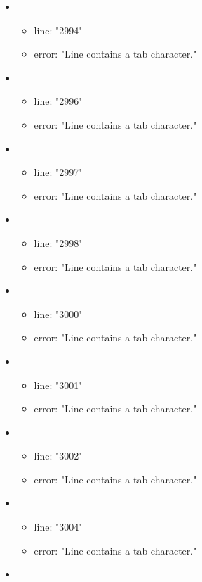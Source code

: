 \begin{itemize}
\begin{itemize}
	\end{itemize}
	\item 
	\begin{itemize} 
		\item line: "2994" 
		\item error: "Line contains a tab character." 
	\end{itemize}
	\item 
	\begin{itemize} 
		\item line: "2996" 
		\item error: "Line contains a tab character." 
	\end{itemize}
	\item 
	\begin{itemize} 
		\item line: "2997" 
		\item error: "Line contains a tab character." 
	\end{itemize}
	\item 
	\begin{itemize} 
		\item line: "2998" 
		\item error: "Line contains a tab character." 
	\end{itemize}
	\item 
	\begin{itemize} 
		\item line: "3000" 
		\item error: "Line contains a tab character." 
	\end{itemize}
	\item 
	\begin{itemize} 
		\item line: "3001" 
		\item error: "Line contains a tab character." 
	\end{itemize}
	\item 
	\begin{itemize} 
		\item line: "3002" 
		\item error: "Line contains a tab character." 
	\end{itemize}
	\item 
	\begin{itemize} 
		\item line: "3004" 
		\item error: "Line contains a tab character." 
	\end{itemize}
	\item 
	\begin{itemize} 

\end{itemize}
\end{itemize}
